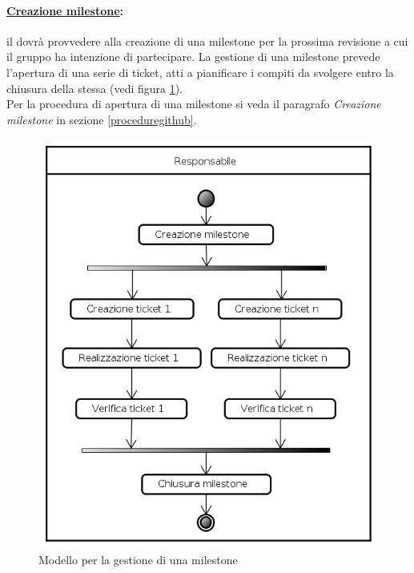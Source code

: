\paragraph{\underline{Creazione milestone}:} il \projectManager{} dovrà provvedere alla creazione di una milestone\g{} per la prossima revisione a cui il gruppo \authorName{} ha intenzione di partecipare. La gestione di una milestone\g{} prevede l'apertura di una serie di ticket, atti a pianificare i compiti da svolgere entro la chiusura della stessa (vedi figura \ref{gestione_milestone}).\\
Per la procedura di apertura di una milestone si veda il paragrafo \textit{Creazione milestone} in sezione \ref{proceduregithub}.
\begin{figure}[!h]
	\centering
	\includegraphics[scale=0.5]{./content/Immagini/Avanzamento_Milestone.png}
	\caption{Modello per la gestione di una milestone}
	\label{gestione_milestone}
\end{figure}


